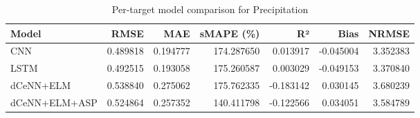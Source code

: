 \begin{table}
\caption{Per-target model comparison for Precipitation}
\begin{tabular}{lrrrrrr}
\toprule
Model & RMSE & MAE & sMAPE (\%) & R² & Bias & NRMSE \\
\midrule
CNN & 0.489818 & 0.194777 & 174.287650 & 0.013917 & -0.045004 & 3.352383 \\
LSTM & 0.492515 & 0.193058 & 175.260587 & 0.003029 & -0.049153 & 3.370840 \\
dCeNN+ELM & 0.538840 & 0.275062 & 175.762335 & -0.183142 & 0.030145 & 3.680239 \\
dCeNN+ELM+ASP & 0.524864 & 0.257352 & 140.411798 & -0.122566 & 0.034051 & 3.584789 \\
\bottomrule
\end{tabular}
\end{table}
